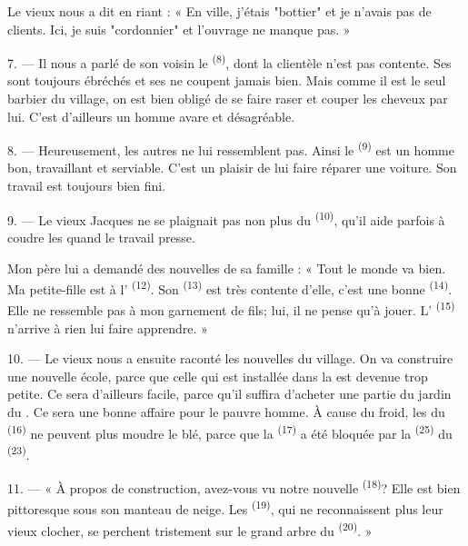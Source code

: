 Le vieux nous a dit en riant : « En ville, j'étais "bottier" et je n'avais pas
de clients. Ici, je suis "cordonnier" et l'ouvrage ne manque pas. »

7. --- Il nous a parlé de son voisin le  \textsuperscript{(8)},
dont la clientèle n'est pas contente. Ses  sont toujours
ébréchés et ses  ne coupent jamais bien. Mais comme il est le
seul barbier du village, on est bien obligé de se faire raser et couper les
cheveux par lui. C'est d'ailleurs un homme avare et désagréable.

8. --- Heureusement, les autres  ne lui ressemblent pas. Ainsi
le  \textsuperscript{(9)} est un homme bon, travaillant et
serviable. C'est un plaisir de lui faire réparer une voiture. Son travail est
toujours bien fini.

9. --- Le vieux Jacques ne se plaignait pas non plus du 
\textsuperscript{(10)}, qu'il aide parfois à coudre les  quand
le travail presse.

Mon père lui a demandé des nouvelles de sa famille : « Tout le monde va bien. Ma
petite-fille est à l' \textsuperscript{(12)}. Son
 \textsuperscript{(13)} est très contente d'elle, c'est une
bonne  \textsuperscript{(14)}. Elle ne ressemble pas à mon
garnement de fils; lui, il ne pense qu'à jouer. L'
\textsuperscript{(15)} n'arrive à rien lui faire apprendre. »

\VUsaut{3.0mm}
\VUsaut{3.0mm}

10. --- Le vieux nous a ensuite raconté les nouvelles du village. On va
construire une nouvelle école, parce que celle qui est installée dans la
 est devenue trop petite. Ce sera d'ailleurs facile, parce qu'il
suffira d'acheter une partie du jardin du . Ce sera une bonne
affaire pour le pauvre homme. À cause du froid, les  du
 \textsuperscript{(16)} ne peuvent plus moudre le blé, parce que
la  \textsuperscript{(17)} a été bloquée par la 
\textsuperscript{(25)} du  \textsuperscript{(23)}.

11. --- « À propos de construction, avez-vous vu notre nouvelle
 \textsuperscript{(18)}? Elle est bien pittoresque sous son
manteau de neige. Les  \textsuperscript{(19)}, qui ne
reconnaissent plus leur vieux clocher, se perchent tristement sur le grand arbre
du  \textsuperscript{(20)}. »

